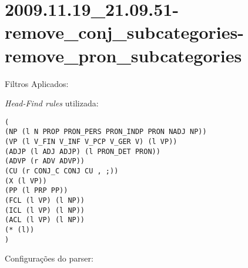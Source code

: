 \section{2009.11.19_21.09.51-remove_conj_subcategories-remove_pron_subcategories} %
\label{sec:exp:2009.11.19_21.09.51-remove_conj_subcategories-remove_pron_subcategories}

Filtros Aplicados:

\begin{itemize}
  
  \item{\emph{RemoveConjSubcategories}
  
  \item{\emph{RemovePronSubcategories}
  
\end{itemize}

\emph{Head-Find rules} utilizada:

\scriptsize
\begin{verbatim}
(
(NP (l N PROP PRON_PERS PRON_INDP PRON NADJ NP))
(VP (l V_FIN V_INF V_PCP V_GER V) (l VP))
(ADJP (l ADJ ADJP) (l PRON_DET PRON))
(ADVP (r ADV ADVP))
(CU (r CONJ_C CONJ CU , ;))
(X (l VP))
(PP (l PRP PP))
(FCL (l VP) (l NP))
(ICL (l VP) (l NP))
(ACL (l VP) (l NP))
(* (l))
)

\end{verbatim}

\normalsize

Configurações do parser:

